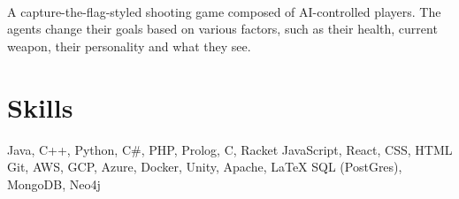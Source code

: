 \documentclass[]{resume-openfont}
\begin{document}
\\
A capture-the-flag-styled shooting game composed of AI-controlled players. The agents change their goals based on various factors, such as their health, current weapon, their personality and what they see.\\
\sectionsep
  
%
%
\section{Skills}

\begin{resumeSkillList}
    \small{\item{
    Java, C++, Python, C\#, PHP, Prolog, C, Racket
    \hspace*{\fill} 
    JavaScript, React, CSS, HTML
    \\
    Git, AWS, GCP, Azure, Docker, Unity, Apache, \LaTeX
    \hspace*{\fill} 
    SQL (PostGres), MongoDB, Neo4j
    }}
\end{resumeSkillList}
\end{document}
